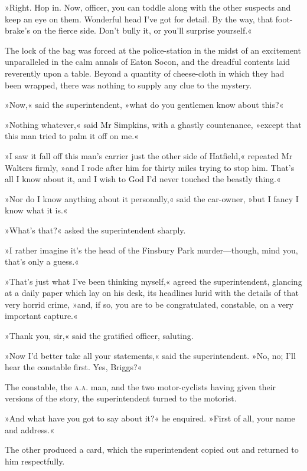 »Right. Hop in. Now, officer, you can toddle along with the other suspects and keep an eye on them. Wonderful head I've got for detail. By the way, that foot-brake's on the fierce side. Don't bully it, or you'll surprise yourself.«

The lock of the bag was forced at the police-station in the midst of an excitement unparalleled in the calm annals of Eaton Socon, and the dreadful contents laid reverently upon a table. Beyond a quantity of cheese-cloth in which they had been wrapped, there was nothing to supply any clue to the mystery.

»Now,« said the superintendent, »what do you gentlemen know about this?«

»Nothing whatever,« said Mr Simpkins, with a ghastly countenance, »except that this man tried to palm it off on me.«

»I saw it fall off this man's carrier just the other side of Hatfield,« repeated Mr Walters firmly, »and I rode after him for thirty miles trying to stop him. That's all I know about it, and I wish to God I'd never touched the beastly thing.«

»Nor do I know anything about it personally,« said the car-owner, »but I fancy I know what it is.«

»What's that?« asked the superintendent sharply.

»I rather imagine it's the head of the Finsbury Park murder—though, mind you, that's only a guess.«

»That's just what I've been thinking myself,« agreed the superintendent, glancing at a daily paper which lay on his desk, its headlines lurid with the details of that very horrid crime, »and, if so, you are to be congratulated, constable, on a very important capture.«

»Thank you, sir,« said the gratified officer, saluting.

»Now I'd better take all your statements,« said the superintendent. »No, no; I'll hear the constable first. Yes, Briggs?«

The constable, the \textsc{a.a.} man, and the two motor-cyclists having given their versions of the story, the superintendent turned to the motorist.

»And what have you got to say about it?« he enquired. »First of all, your name and address.«

The other produced a card, which the superintendent copied out and returned to him respectfully.

